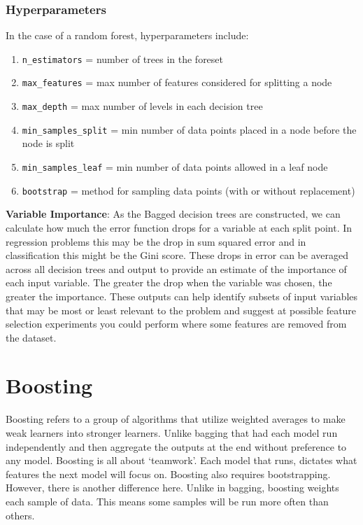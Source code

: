 \documentclass{article}
\begin{document}
\subsubsection{Hyperparameters}
In the case of a random forest, hyperparameters include:
\begin{enumerate}
\item \texttt{n\_estimators} = number of trees in the foreset
\item \texttt{max\_features} = max number of features considered for splitting a node
\item \texttt{max\_depth} = max number of levels in each decision tree
\item \texttt{min\_samples\_split} = min number of data points placed in a node before the node is split
\item \texttt{min\_samples\_leaf} = min number of data points allowed in a leaf node
\item \texttt{bootstrap} = method for sampling data points (with or without replacement)
\end{enumerate}

\textbf{Variable Importance}: As the Bagged decision trees are constructed, we can calculate how much the error function drops for a variable at each split point.
In regression problems this may be the drop in sum squared error and in classification this might be the Gini score.
These drops in error can be averaged across all decision trees and output to provide an estimate of the importance of each input variable. The greater the drop when the variable was chosen, the greater the importance.
These outputs can help identify subsets of input variables that may be most or least relevant to the problem and suggest at possible feature selection experiments you could perform where some features are removed from the dataset.

\section{Boosting}
Boosting refers to a group of algorithms that utilize weighted averages to make weak learners into stronger learners. Unlike bagging that had each model run independently and then aggregate the outputs at the end without preference to any model. Boosting is all about `teamwork'. Each model that runs, dictates what features the next model will focus on.
Boosting also requires bootstrapping. However, there is another difference here. Unlike in bagging, boosting weights each sample of data. This means some samples will be run more often than others.
\end{document}
